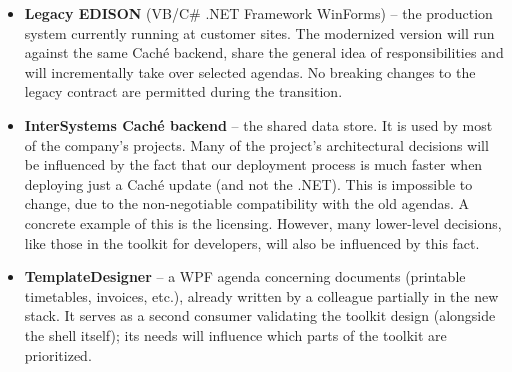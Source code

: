 \documentclass{article}
\begin{document}
\begin{itemize}
  \item \textbf{Legacy EDISON} (VB/C\# .NET Framework WinForms) -- the production system currently running at customer sites. The modernized version will run against the same Caché backend, share the general idea of responsibilities and will incrementally take over selected agendas. No breaking changes to the legacy contract are permitted during the transition.
  \item \textbf{InterSystems Caché backend} -- the shared data store. It is used by most of the company's projects. Many of the project's architectural decisions will be influenced by the fact that our deployment process is much faster when deploying just a Caché update (and not the .NET). This is impossible to change, due to the non-negotiable compatibility with the old agendas. A concrete example of this is the licensing. However, many lower-level decisions, like those in the toolkit for developers, will also be influenced by this fact. 
  \item \textbf{TemplateDesigner} -- a WPF agenda concerning documents (printable timetables, invoices, etc.), already written by a colleague partially in the new stack. It serves as a second consumer validating the toolkit design (alongside the shell itself); its needs will influence which parts of the toolkit are prioritized.
\end{itemize}

\end{document}
